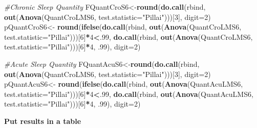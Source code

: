 \documentclass[
]{book}
\newenvironment{Shaded}{\begin{snugshade}}{\end{snugshade}}
\newcommand{\CommentTok}[1]{\textcolor[rgb]{0.56,0.35,0.01}{\textit{#1}}}
\newcommand{\DataTypeTok}[1]{\textcolor[rgb]{0.13,0.29,0.53}{#1}}
\newcommand{\DecValTok}[1]{\textcolor[rgb]{0.00,0.00,0.81}{#1}}
\newcommand{\FloatTok}[1]{\textcolor[rgb]{0.00,0.00,0.81}{#1}}
\newcommand{\KeywordTok}[1]{\textcolor[rgb]{0.13,0.29,0.53}{\textbf{#1}}}
\newcommand{\NormalTok}[1]{#1}
\newcommand{\OperatorTok}[1]{\textcolor[rgb]{0.81,0.36,0.00}{\textbf{#1}}}
\newcommand{\StringTok}[1]{\textcolor[rgb]{0.31,0.60,0.02}{#1}}
\begin{document}
\begin{Shaded}
\begin{Highlighting}[]
\CommentTok{#Chronic Sleep Quantity}
\NormalTok{FQuantCroS6<-}\KeywordTok{round}\NormalTok{(}\KeywordTok{do.call}\NormalTok{(rbind, }\KeywordTok{out}\NormalTok{(}\KeywordTok{Anova}\NormalTok{(QuantCroLMS6, }\DataTypeTok{test.statistic=}\StringTok{"Pillai"}\NormalTok{)))[}\DecValTok{3}\NormalTok{], }\DataTypeTok{digit=}\DecValTok{2}\NormalTok{)}
\NormalTok{pQuantCroS6<-}\StringTok{  }\KeywordTok{round}\NormalTok{(}\KeywordTok{ifelse}\NormalTok{(}\KeywordTok{do.call}\NormalTok{(rbind, }\KeywordTok{out}\NormalTok{(}\KeywordTok{Anova}\NormalTok{(QuantCroLMS6, }\DataTypeTok{test.statistic=}\StringTok{"Pillai"}\NormalTok{)))[}\DecValTok{6}\NormalTok{]}\OperatorTok{*}\DecValTok{4}\OperatorTok{<}\NormalTok{.}\DecValTok{99}\NormalTok{, }\KeywordTok{do.call}\NormalTok{(rbind, }\KeywordTok{out}\NormalTok{(}\KeywordTok{Anova}\NormalTok{(QuantCroLMS6, }\DataTypeTok{test.statistic=}\StringTok{"Pillai"}\NormalTok{)))[}\DecValTok{6}\NormalTok{]}\OperatorTok{*}\DecValTok{4}\NormalTok{, }\FloatTok{.99}\NormalTok{), }\DataTypeTok{digit=}\DecValTok{2}\NormalTok{)}

\CommentTok{#Acute Sleep Quantity}
\NormalTok{FQuantAcuS6<-}\KeywordTok{round}\NormalTok{(}\KeywordTok{do.call}\NormalTok{(rbind, }\KeywordTok{out}\NormalTok{(}\KeywordTok{Anova}\NormalTok{(QuantCroLMS6, }\DataTypeTok{test.statistic=}\StringTok{"Pillai"}\NormalTok{)))[}\DecValTok{3}\NormalTok{], }\DataTypeTok{digit=}\DecValTok{2}\NormalTok{)}
\NormalTok{pQuantAcuS6<-}\StringTok{  }\KeywordTok{round}\NormalTok{(}\KeywordTok{ifelse}\NormalTok{(}\KeywordTok{do.call}\NormalTok{(rbind, }\KeywordTok{out}\NormalTok{(}\KeywordTok{Anova}\NormalTok{(QuantAcuLMS6, }\DataTypeTok{test.statistic=}\StringTok{"Pillai"}\NormalTok{)))[}\DecValTok{6}\NormalTok{]}\OperatorTok{*}\DecValTok{4}\OperatorTok{<}\NormalTok{.}\DecValTok{99}\NormalTok{, }\KeywordTok{do.call}\NormalTok{(rbind, }\KeywordTok{out}\NormalTok{(}\KeywordTok{Anova}\NormalTok{(QuantAcuLMS6, }\DataTypeTok{test.statistic=}\StringTok{"Pillai"}\NormalTok{)))[}\DecValTok{6}\NormalTok{]}\OperatorTok{*}\DecValTok{4}\NormalTok{, }\FloatTok{.99}\NormalTok{), }\DataTypeTok{digit=}\DecValTok{2}\NormalTok{)}
\end{Highlighting}
\end{Shaded}

\textbf{Put results in a table}
\end{document}
